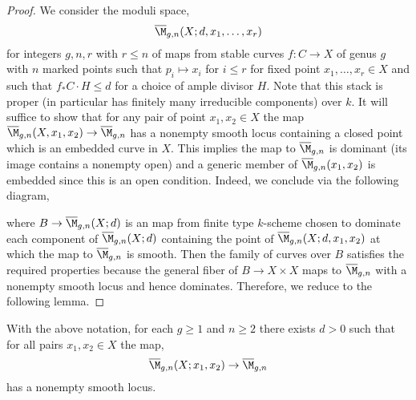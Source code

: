 \documentclass[12pt]{article}
\begin{document}
\begin{proof}
We consider the moduli space,
\[ \overline{\M}_{g,n}(X ; d,  x_1, \dots, x_r) \]
for integers $g,n,r$ with $r \le n$ of maps from stable curves $f : C \to X$ of genus $g$ with $n$ marked points such that $p_i \mapsto x_i$ for $i \le r$ for fixed point $x_1, \dots, x_r \in X$ and such that $f_* C \cdot H \le d$ for a choice of ample divisor $H$. Note that this stack is proper (in particular has finitely many irreducible components) over $k$. It will suffice to show that for any pair of point $x_1, x_2 \in X$ the map $\overline{\M}_{g,n}(X, x_1, x_2) \to \overline{\M}_{g,n}$ has a nonempty smooth locus containing a closed point which is an embedded curve in $X$. This implies the map to $\overline{\M}_{g,n}$ is dominant (its image contains a nonempty open) and a generic member of $\overline{\M}_{g,n}(x_1, x_2)$ is embedded since this is an open condition. Indeed, we conclude via the following diagram,
\begin{center}
\end{center}
where $B \to \overline{\M}_{g,n}(X ; d)$ is an \etale map from finite type $k$-scheme chosen to dominate each component of $\overline{\M}_{g,n}(X ; d)$ containing the point of $\overline{\M}_{g,n}(X ; d, x_1, x_2)$ at which the map to $\overline{\M}_{g,n}$ is smooth. Then the family of curves over $B$ satisfies the required properties because the general fiber of $B \to X \times X$ maps to $\overline{\M}_{g,n}$ with a nonempty smooth locus and hence dominates. Therefore, we reduce to the following lemma.
\end{proof}

\begin{lemma}
With the above notation, for each $g \ge 1$ and $n \ge 2$ there exists $d > 0$ such that for all pairs $x_1, x_2 \in X$ the map,
\[ \overline{\M}_{g,n}(X ; x_1, x_2) \to \overline{\M}_{g,n} \]
has a nonempty smooth locus.
\end{lemma}
\end{document}
